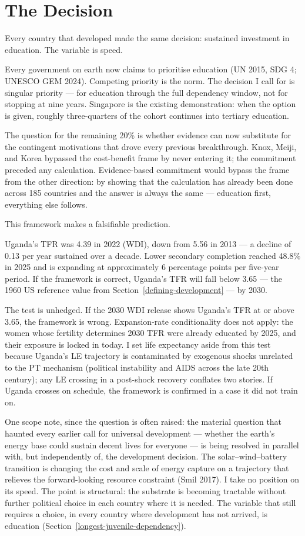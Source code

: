 \documentclass[12pt,letterpaper]{article}
\begin{document}
\section{The Decision}\label{the-decision}

Every country that developed made the same decision: sustained
investment in education. The variable is speed.

Every government on earth now claims to prioritise education (UN
2015, SDG 4; UNESCO GEM 2024). Competing priority is the norm. The
decision I call for is singular priority --- for education through
the full dependency window, not for stopping at nine years. Singapore
is the existing demonstration: when the option is given, roughly
three-quarters of the cohort continues into tertiary education.

The question for the remaining 20\% is whether evidence can now
substitute for the contingent motivations that drove every previous
breakthrough. Knox, Meiji, and Korea bypassed the cost-benefit frame by
never entering it; the commitment preceded any calculation.
Evidence-based commitment would bypass the frame from the other
direction: by showing that the calculation has already been done across
185 countries and the answer is always the same --- education first,
everything else follows.

This framework makes a falsifiable prediction.

Uganda's TFR was 4.39 in 2022 (WDI), down from 5.56 in 2013 --- a
decline of 0.13 per year sustained over a decade. Lower secondary
completion reached 48.8\% in 2025 and is expanding at approximately 6
percentage points per five-year period. If the framework is correct,
Uganda's TFR will fall below 3.65 --- the 1960 US reference value from
Section~\ref{defining-development} --- by 2030.

The test is unhedged. If the 2030 WDI release shows Uganda's TFR at or
above 3.65, the framework is wrong. Expansion-rate conditionality does
not apply: the women whose fertility determines 2030 TFR were already
educated by 2025, and their exposure is locked in today. I set life
expectancy aside from this test because Uganda's LE trajectory is
contaminated by exogenous shocks unrelated to the PT mechanism
(political instability and AIDS across the late 20th century); any
LE crossing in a post-shock recovery conflates two stories. If Uganda
crosses on schedule, the framework is confirmed in a case it did not
train on.

One scope note, since the question is often raised: the material
question that haunted every earlier call for universal development ---
whether the earth's energy base could sustain decent lives for everyone
--- is being resolved in parallel with, but independently of, the
development decision. The solar--wind--battery transition is changing
the cost and scale of energy capture on a trajectory that relieves the
forward-looking resource constraint (Smil 2017). I take no
position on its speed. The point is structural: the substrate is
becoming tractable without further political choice in each country
where it is needed. The variable that still requires a choice, in every
country where development has not arrived, is education
(Section~\ref{longest-juvenile-dependency}).
\end{document}
